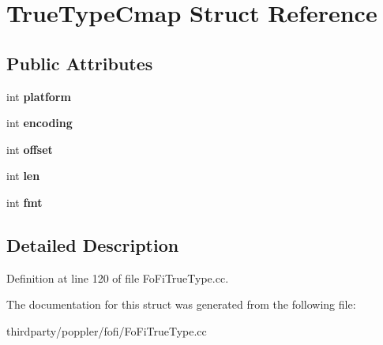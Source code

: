 \hypertarget{struct_true_type_cmap}{}\section{True\+Type\+Cmap Struct Reference}
\label{struct_true_type_cmap}
\subsection*{Public Attributes}
\begin{DoxyCompactItemize}
\item 
\mbox{\label{struct_true_type_cmap_a1679481c25a4c8773d5e3dc1e4d30e0e}} 
int {\bfseries platform}
\item 
\mbox{\label{struct_true_type_cmap_acdc9bf54f3638072f6725cb637ce75b9}} 
int {\bfseries encoding}
\item 
\mbox{\label{struct_true_type_cmap_a1cc47b245a1cbb3f729e15cd5d57d746}} 
int {\bfseries offset}
\item 
\mbox{\label{struct_true_type_cmap_aea2f5d98190d25e31572f0e90a36cfa5}} 
int {\bfseries len}
\item 
\mbox{\label{struct_true_type_cmap_a9fc52d19986ae8c721c40d55a8157530}} 
int {\bfseries fmt}
\end{DoxyCompactItemize}


\subsection{Detailed Description}


Definition at line 120 of file Fo\+Fi\+True\+Type.\+cc.



The documentation for this struct was generated from the following file\+:\begin{DoxyCompactItemize}
\item 
thirdparty/poppler/fofi/Fo\+Fi\+True\+Type.\+cc\end{DoxyCompactItemize}
